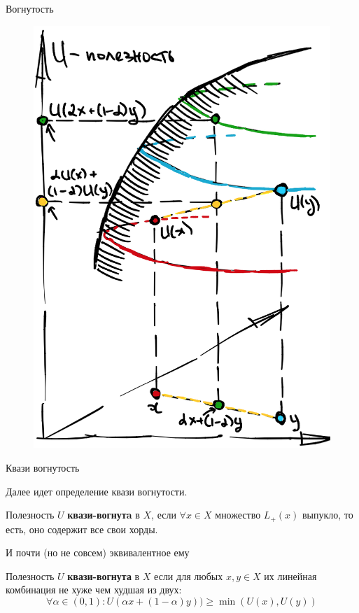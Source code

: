 \documentclass{beamer}
\begin{document}
\begin{frame}{Вогнутость}

\begin{figure}[hbt]
\centering
\includegraphics[width=.5 \textwidth]{concave.png}
\end{figure}

\end{frame}

\begin{frame}{Квази вогнутость}

Далее идет определение квази вогнутости.

\begin{definition}
Полезность $U$ \textbf{квази-вогнутa} в $X$, если $\forall x \in X$ множество $L_{+}(x)$ выпукло, то есть, оно содержит все свои хорды. 
\end{definition}

И почти (но не совсем) эквивалентное ему

\begin{definition}
Полезность $U$ \textbf{квази-вогнута} в $X$ если для любых $x, y \in X$ их линейная комбинация не хуже чем худшая из двух:
$$ \forall \alpha \in (0,1): U(\alpha x + (1-\alpha) y)) \geqslant \min(U(x), U(y))$$

\end{definition}

\end{frame}
\end{document}
